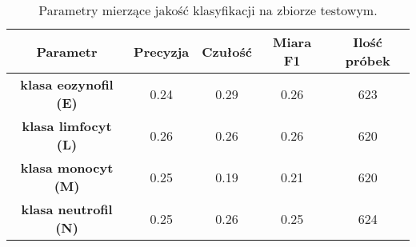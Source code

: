 {\begin{itemize}
\begin{table}[h!]
\centering
\caption[Short Heading]{Parametry mierzące jakość klasyfikacji na zbiorze testowym.}
\label{tab:kaggle_3_params_val}
\begin{tabular}{|c|c|c|c|c|}
\hline
\textbf{Parametr}                               & \textbf{Precyzja} & \textbf{Czułość} & \textbf{Miara F1} & \textbf{Ilość próbek} \\ \hline
\textbf{klasa eozynofil (E)} & 0.24   & 0.29   & 0.26 & 623  \\ \hline
\textbf{klasa limfocyt (L)} & 0.26  & 0.26 & 0.26  & 620  \\ \hline
\textbf{klasa monocyt (M)} & 0.25   & 0.19    & 0.21  & 620  \\ \hline
\textbf{klasa neutrofil (N)} & 0.25   & 0.26    & 0.25  & 624  \\ \hline
\end{tabular}
\end{table}

\end{itemize}
}
